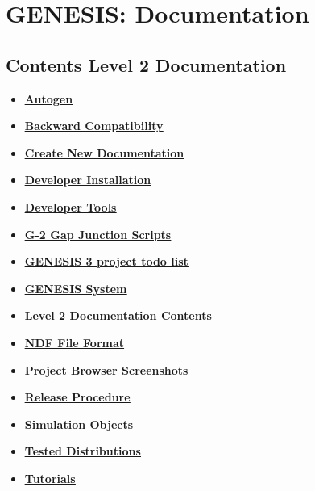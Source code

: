 \documentclass[12pt]{article}
\begin{document}
\section*{GENESIS: Documentation}

\subsection*{Contents Level 2 Documentation}

\begin{itemize}

\item \href{../autogen/autogen.pdf}{\bf \underline{Autogen}}

\item \href{../backward-compatibility/backward-compatibility.pdf}{\bf \underline{Backward Compatibility}}

\item \href{../create-document/create-document.pdf}{\bf \underline{Create New Documentation}}

\item \href{../developer-installation/developer-installation.pdf}{\bf \underline{Developer Installation}}

\item \href{../developer-tools/developer-tools.pdf}{\bf \underline{Developer Tools}}

\item \href{../g2-gap-junction/g2-gap-junction.pdf}{\bf \underline{G-2 Gap Junction Scripts}}

\item \href{../project-todo/project-todo.pdf}{\bf \underline{GENESIS 3 project todo list}}

\item \href{../genesis-system/genesis-system.pdf}{\bf \underline{GENESIS System}}

\item \href{../contents-level2/contents-level2.pdf}{\bf \underline{Level 2 Documentation Contents}}

\item \href{../ndf-file-format/ndf-file-format.pdf}{\bf \underline{NDF File Format}}

\item \href{../project-browser-screenshots/project-browser-screenshots.pdf}{\bf \underline{Project Browser Screenshots}}

\item \href{../release-procedure/release-procedure.pdf}{\bf \underline{Release Procedure}}

\item \href{../simulation-objects/simulation-objects.pdf}{\bf \underline{Simulation Objects}}

\item \href{../tested-distributions/tested-distributions.pdf}{\bf \underline{Tested Distributions}}

\item \href{../tutorial-genesis/tutorial-genesis.pdf}{\bf \underline{Tutorials}}


\end{itemize}

\end{document}
